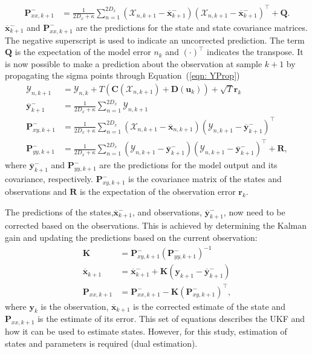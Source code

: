 \begin{align}
\mathbf{P}_{xx,k+1}^{-} &= \frac{1}{2D_{x}+\kappa}\sum_{n=1}^{2D_{x}} (\mathbf{\mathcal{X}}_{n,k+1} -\mathbf{\overline{x}}_{k+1}^{-})(\mathbf{\mathcal{X}}_{n,k+1}-\mathbf{\overline{x}}_{k+1}^{-})^{\top} + \mathbf{Q}.%
\end{align} $\overline{\mathbf{x}}_{k+1}^{-}$ and $\mathbf{P}_{xx,k+1}^{-}$ are the predictions for the state and state covariance matrices. The negative superscript is used to indicate an uncorrected prediction. The term $\mathbf{Q}$ is the expectation of the model error $n_{k}$ and $(\cdot)^{\top}$ indicates the transpose. It is now possible to make a prediction about the observation at sample $k+1$ by propagating the sigma points through Equation~(\ref{eqn: YProp}) \begin{align} %
\mathbf{\mathcal{Y}}_{n,k+1} &= \mathbf{\mathcal{Y}}_{n,k} + T(\mathbf{C}(\mathbf{\mathcal{X}}_{n,k+1})+ \mathbf{D}(\mathbf{u}_{k}))+ \sqrt{T}\mathbf{r}_{k}\\
\overline{\mathbf{y}}_{k+1}^{-} &= \frac{1}{2D_{x}+\kappa}\sum_{n=1}^{2D_{x}} \mathbf{\mathcal{Y}}_{n,k+1}\\
\label{eqn: statecovg}
\mathbf{P}_{xy,k+1}^{-} &= \frac{1}{2D_{x}+\kappa}\sum_{n=1}^{2D_{x}} (\mathbf{\mathcal{X}}_{n,k+1}-\overline{\mathbf{x}}_{n,k+1}) (\mathbf{\mathcal{Y}}_{n,k+1}-\overline{\mathbf{y}}_{k+1}^{-})^{\top}\\
\mathbf{P}_{yy,k+1}^{-} &= \frac{1}{2D_{x}+\kappa}\sum_{n=1}^{2D_{x}} (\mathbf{\mathcal{Y}}_{n,k+1}-\overline{\mathbf{y}}_{k+1}^{-}) (\mathbf{\mathcal{Y}}_{n,k+1}-\overline{\mathbf{y}}_{k+1}^{-})^{\top} +\mathbf{R},%
\end{align} where $\overline{\mathbf{y}}_{k+1}^{-}$ and $\mathbf{P}_{yy,k+1}^{-}$ are the predictions for the model output and its covariance, respectively. $\mathbf{P}_{xy,k+1}^{-}$ is the covariance matrix of the states and observations and $\mathbf{R}$ is the expectation of the observation error $\mathbf{r}_{k}$.

The predictions of the states,$\overline{\mathbf{x}}_{k+1}^{-}$, and observations, $\overline{\mathbf{y}}_{k+1}^{-}$, now need to be corrected based on the observations. This is achieved by determining the Kalman gain and updating the predictions based on the current observation: \begin{align}
\mathbf{K} &= \mathbf{P}_{xy,k+1}^{-}(\mathbf{P}_{yy,k+1}^{-})^{-1}\\
\overline{\mathbf{x}}_{k+1} &= \overline{\mathbf{x}}_{k+1}^{-} + \mathbf{K}(\mathbf{y}_{k+1}-\overline{\mathbf{y}}_{k+1}^{-})\\
\mathbf{P}_{xx,k+1} &= \mathbf{P}_{xx,k+1}^{-} - \mathbf{K}(\mathbf{P}_{xy,k+1}^{-})^{\top},
\end{align} where $\mathbf{y}_{k}$ is the observation, $\overline{\mathbf{x}}_{k+1}$ is the corrected estimate of the state and $\mathbf{P}_{xx,k+1}$ is the estimate of its error. This set of equations describes the UKF and how it can be used to estimate states. However, for this study, estimation of states and parameters is required (dual estimation).


